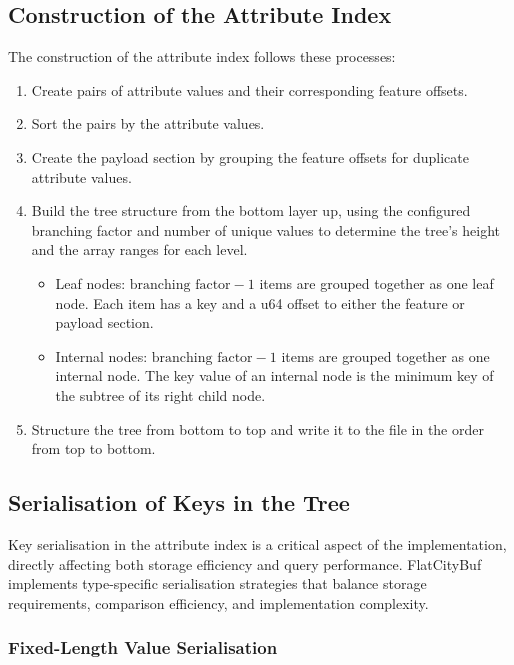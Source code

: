 \subsection{Construction of the Attribute Index}
\label{methodology:attribute_index:construction}

The construction of the attribute index follows these processes:

\begin{enumerate}
\item Create pairs of attribute values and their corresponding feature offsets.
\item Sort the pairs by the attribute values.
\item Create the payload section by grouping the feature offsets for duplicate attribute values.
\item Build the tree structure from the bottom layer up, using the configured branching factor and number of unique values to determine the tree's height and the array ranges for each level.
\begin{itemize}
  \item Leaf nodes: $\text{branching factor} - 1$ items are grouped together as one leaf node. Each item has a key and a u64 offset to either the feature or payload section.
  \item Internal nodes: $\text{branching factor} - 1$ items are grouped together as one internal node. The key value of an internal node is the minimum key of the subtree of its right child node.
\end{itemize}
\item Structure the tree from bottom to top and write it to the file in the order from top to bottom.
\end{enumerate}

\subsection{Serialisation of Keys in the Tree}
\label{methodology:attribute_index:key_serialisation}

Key serialisation in the attribute index is a critical aspect of the implementation, directly affecting both storage efficiency and query performance. FlatCityBuf implements type-specific serialisation strategies that balance storage requirements, comparison efficiency, and implementation complexity.

\subsubsection{Fixed-Length Value Serialisation}
\label{methodology:attribute_index:fixed_length_serialisation}

